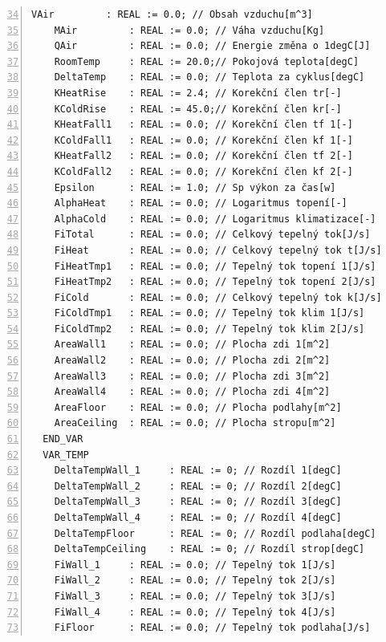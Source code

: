 \begin{lstlisting}[language=ST, breaklines=true, numbers=left, firstnumber=34, numberstyle=\small, numbersep=10pt, frame=single, basicstyle=\ttfamily\small]
    VAir         : REAL := 0.0; // Obsah vzduchu[m^3]
    MAir         : REAL := 0.0; // Váha vzduchu[Kg]
    QAir         : REAL := 0.0; // Energie změna o 1degC[J]
    RoomTemp     : REAL := 20.0;// Pokojová teplota[degC]
    DeltaTemp    : REAL := 0.0; // Teplota za cyklus[degC]
    KHeatRise    : REAL := 2.4; // Korekční člen tr[-]
    KColdRise    : REAL := 45.0;// Korekční člen kr[-]
    KHeatFall1   : REAL := 0.0; // Korekční člen tf 1[-]
    KColdFall1   : REAL := 0.0; // Korekční člen kf 1[-]
    KHeatFall2   : REAL := 0.0; // Korekční člen tf 2[-]
    KColdFall2   : REAL := 0.0; // Korekční člen kf 2[-]
    Epsilon      : REAL := 1.0; // Sp výkon za čas[w]
    AlphaHeat    : REAL := 0.0; // Logaritmus topení[-]
    AlphaCold    : REAL := 0.0; // Logaritmus klimatizace[-]
    FiTotal      : REAL := 0.0; // Celkový tepelný tok[J/s]
    FiHeat       : REAL := 0.0; // Celkový tepelný tok t[J/s]
    FiHeatTmp1   : REAL := 0.0; // Tepelný tok topení 1[J/s]
    FiHeatTmp2   : REAL := 0.0; // Tepelný tok topení 2[J/s]
    FiCold       : REAL := 0.0; // Celkový tepelný tok k[J/s]
    FiColdTmp1   : REAL := 0.0; // Tepelný tok klim 1[J/s]
    FiColdTmp2   : REAL := 0.0; // Tepelný tok klim 2[J/s]
    AreaWall1    : REAL := 0.0; // Plocha zdi 1[m^2]
    AreaWall2    : REAL := 0.0; // Plocha zdi 2[m^2]
    AreaWall3    : REAL := 0.0; // Plocha zdi 3[m^2]
    AreaWall4    : REAL := 0.0; // Plocha zdi 4[m^2]
    AreaFloor    : REAL := 0.0; // Plocha podlahy[m^2]
    AreaCeiling  : REAL := 0.0; // Plocha stropu[m^2]
  END_VAR
  VAR_TEMP
    DeltaTempWall_1     : REAL := 0; // Rozdíl 1[degC]
    DeltaTempWall_2     : REAL := 0; // Rozdíl 2[degC]
    DeltaTempWall_3     : REAL := 0; // Rozdíl 3[degC]
    DeltaTempWall_4     : REAL := 0; // Rozdíl 4[degC]
    DeltaTempFloor      : REAL := 0; // Rozdíl podlaha[degC]
    DeltaTempCeiling    : REAL := 0; // Rozdíl strop[degC]
    FiWall_1     : REAL := 0.0; // Tepelný tok 1[J/s]
    FiWall_2     : REAL := 0.0; // Tepelný tok 2[J/s]
    FiWall_3     : REAL := 0.0; // Tepelný tok 3[J/s]
    FiWall_4     : REAL := 0.0; // Tepelný tok 4[J/s]
    FiFloor      : REAL := 0.0; // Tepelný tok podlaha[J/s]
\end{lstlisting}
\pagebreak
